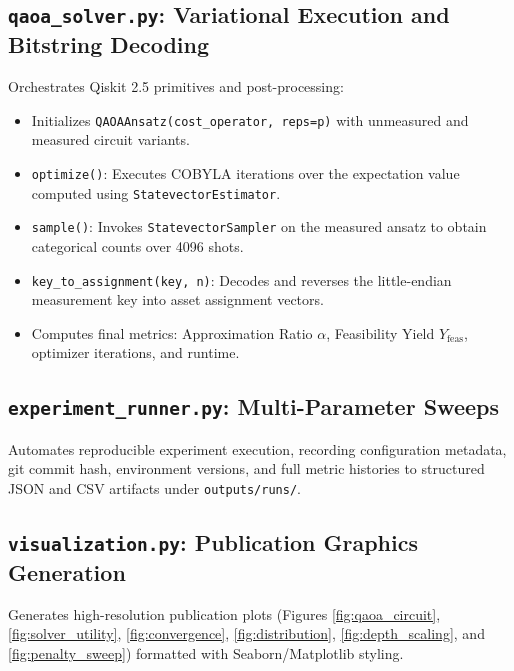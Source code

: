 \subsection{\texttt{qaoa\_solver.py}: Variational Execution and Bitstring Decoding}
Orchestrates Qiskit 2.5 primitives and post-processing:
\begin{itemize}
    \item Initializes \texttt{QAOAAnsatz(cost\_operator, reps=p)} with unmeasured and measured circuit variants.
    \item \texttt{optimize()}: Executes COBYLA iterations over the expectation value computed using \texttt{StatevectorEstimator}.
    \item \texttt{sample()}: Invokes \texttt{StatevectorSampler} on the measured ansatz to obtain categorical counts over 4096 shots.
    \item \texttt{key\_to\_assignment(key, n)}: Decodes and reverses the little-endian measurement key into asset assignment vectors.
    \item Computes final metrics: Approximation Ratio $\alpha$, Feasibility Yield $Y_{\text{feas}}$, optimizer iterations, and runtime.
\end{itemize}

\subsection{\texttt{experiment\_runner.py}: Multi-Parameter Sweeps}
Automates reproducible experiment execution, recording configuration metadata, git commit hash, environment versions, and full metric histories to structured JSON and CSV artifacts under \texttt{outputs/runs/}.

\subsection{\texttt{visualization.py}: Publication Graphics Generation}
Generates high-resolution publication plots (Figures \ref{fig:qaoa_circuit}, \ref{fig:solver_utility}, \ref{fig:convergence}, \ref{fig:distribution}, \ref{fig:depth_scaling}, and \ref{fig:penalty_sweep}) formatted with Seaborn/Matplotlib styling.


